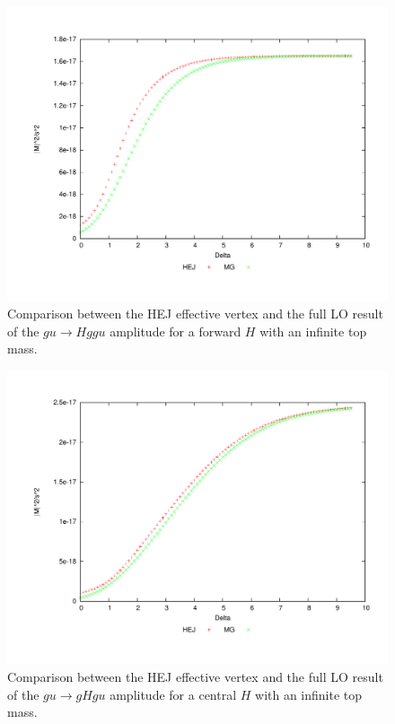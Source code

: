 \begin{figure}[t]
\centering
\includegraphics[scale=0.45]{Images/ug_nextfor.pdf}
\caption{Comparison between the HEJ effective vertex and the full LO result of the $gu \to Hggu$ amplitude for a forward $H$ with an infinite top mass.}
\label{fig:ug_for} 
\end{figure}
\begin{figure}[t]
\centering
\includegraphics[scale=0.45]{Images/ug_cen.pdf}
\caption{Comparison between the HEJ effective vertex and the full LO result of the $gu \to gHgu$ amplitude for a central $H$ with an infinite top mass.}
\label{fig:ug_cen}
\end{figure}
